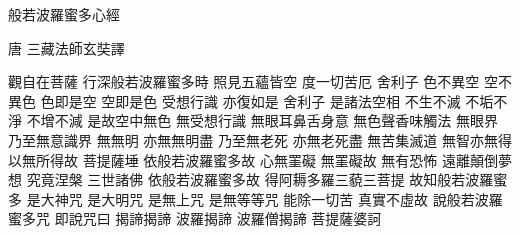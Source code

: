 \documentclass{ctexbook}
\begin{document}
\fontsize{36}{36}
\selectfont

\parindent=0pt

\begin{withgezhu}
般若波羅蜜多心經

唐 三藏法師玄奘譯

觀自在菩薩
行深般若波羅蜜多時
照見五蘊皆空
度一切苦厄
舍利子
色不異空
空不異色
色即是空
空即是色
受想行識
亦復如是
舍利子
是諸法空相
不生不滅
不垢不淨
不增不減
是故空中無色
無受想行識
無眼耳鼻舌身意
無色聲香味觸法
無眼界
乃至無意識界
無無明
亦無無明盡
乃至無老死
亦無老死盡
無苦集滅道
無智亦無得
以無所得故
菩提薩埵
 依般若波羅蜜多故
心無罣礙
無罣礙故
無有恐怖
遠離顛倒夢想
究竟涅槃
三世諸佛
依般若波羅蜜多故
得阿耨多羅三藐三菩提
故知般若波羅蜜多
是大神咒
是大明咒
是無上咒
是無等等咒
能除一切苦
真實不虛故
說般若波羅蜜多咒
即說咒曰
揭諦揭諦
波羅揭諦
波羅僧揭諦
菩提薩婆訶
\end{withgezhu}
\end{document}
